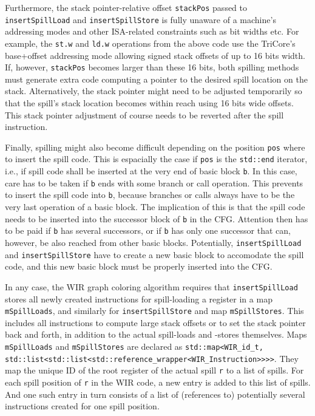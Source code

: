 Furthermore, the stack pointer-relative offset \texttt{stackPos} passed to \texttt{insertSpillLoad} and \texttt{insertSpillStore} is fully unaware of a machine's addressing modes and other \gls{ISA}-related constraints such as bit widths etc.
For example, the \texttt{st.w} and \texttt{ld.w} operations from the above code use the TriCore's base+offset addressing mode allowing signed stack offsets of up to 16 bits width.
If, however, \texttt{stackPos} becomes larger than these 16 bits, both spilling methods must generate extra code computing a pointer to the desired spill location on the stack.
Alternatively, the stack pointer might need to be adjusted temporarily so that the spill's stack location becomes within reach using 16 bits wide offsets.
This stack pointer adjustment of course needs to be reverted after the spill instruction.

Finally, spilling might also become difficult depending on the position \texttt{pos} where to insert the spill code.
This is espacially the case if \texttt{pos} is the \texttt{std::end} iterator, i.e., if spill code shall be inserted at the very end of basic block \texttt{b}.
In this case, care has to be taken if \texttt{b} ends with some branch or call operation.
This prevents to insert the spill code into \texttt{b}, because branches or calls always have to be the very last operation of a basic block.
The implication of this is that the spill code needs to be inserted into the successor block of \texttt{b} in the \gls{CFG}.
Attention then has to be paid if \texttt{b} has several successors, or if \texttt{b} has only one successor that can, however, be also reached from other basic blocks.
Potentially, \texttt{insertSpillLoad} and \texttt{insertSpillStore} have to create a new basic block to accomodate the spill code, and this new basic block must be properly inserted into the \gls{CFG}.

In any case, the \gls{WIR} graph coloring algorithm requires that \texttt{insertSpillLoad} stores all newly created instructions for spill-loading a register in a map \texttt{mSpillLoads}, and similarly for \texttt{insertSpillStore} and map \texttt{mSpillStores}.
This includes all instructions to compute large stack offsets or to set the stack pointer back and forth, in addition to the actual spill-loads and -stores themselves.
Maps \texttt{mSpillLoads} and \texttt{mSpillStores} are declared as \texttt{std::map<WIR\_id\_t, std::list<std::list<std::reference\_wrapper<WIR\_Instruc\-tion>{}>{}>{}>}.
They map the unique ID of the root register of the actual spill \texttt{r} to a list of spills.
For each spill position of \texttt{r} in the \gls{WIR} code, a new entry is added to this list of spills.
And one such entry in turn consists of a list of (references to) potentially several instructions created for one spill position.


